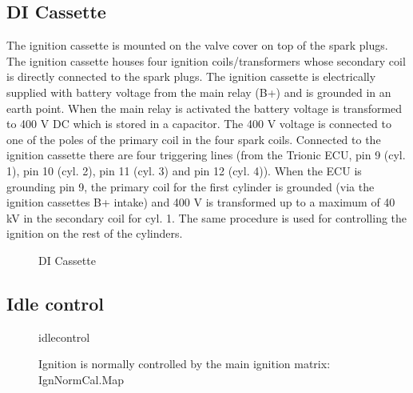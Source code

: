 \documentclass[11pt,a4paper]{book}
\newcommand{\Mfig}[1]{%
\begin{figure}[<+htpb+>]
    \centering
    \missingfigure{}
    \caption{#1}
\end{figure}}
\begin{document}
\subsection{DI Cassette}
The ignition cassette is mounted on the valve cover on top of the spark plugs. The ignition cassette
houses four ignition coils/transformers whose secondary coil is directly connected to the spark plugs.
The ignition cassette is electrically supplied with battery voltage from the main relay (B+) and is
grounded in an earth point. When the main relay is activated the battery voltage is transformed to
400 V DC which is stored in a capacitor. The 400 V voltage is connected to one of the poles of the
primary coil in the four spark coils. Connected to the ignition cassette there are four triggering lines
(from the Trionic ECU, pin 9 (cyl. 1), pin 10 (cyl. 2), pin 11 (cyl. 3) and pin 12 (cyl. 4)). When the ECU
is grounding pin 9, the primary coil for the first cylinder is grounded (via the ignition cassettes B+
intake) and 400 V is transformed up to a maximum of 40 kV in the secondary coil for cyl. 1. The same
procedure is used for controlling the ignition on the rest of the cylinders.
\Mfig{DI Cassette}

\subsection{Idle control}
\Mfig{idlecontrol}
\Mfig{Ignition is normally controlled by the main ignition matrix:
IgnNormCal.Map}
\end{document}
